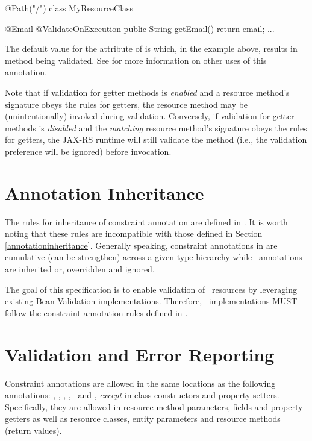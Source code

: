 \begin{listing}{1}
@Path("/")
class MyResourceClass {

  @Email
  @ValidateOnExecution
  public String getEmail() {
    return email;
  }
  ...
}
\end{listing}

The default value for the  attribute of  is  which, in the example above, results in method  being validated. See \cite{bv11} for more information on other uses of this annotation. 

Note that if validation for getter methods is {\em enabled} and a resource method's signature obeys the rules for getters, the resource method may be (unintentionally) invoked during validation. Conversely, if validation for getter methods is {\em disabled} and the {\em matching} resource method's signature obeys the rules for getters, the JAX-RS runtime will still validate the method (i.e., the validation preference will be ignored) before invocation.

\section{Annotation Inheritance}
\label{annotation_inheritance}

The rules for inheritance of constraint annotation are defined in \cite{bv11}. It is worth noting that these rules are incompatible with those defined in Section \ref{annotationinheritance}. Generally speaking, constraint annotations in \cite{bv11} are cumulative (can be strengthen) across a given type hierarchy while \jaxrs\ annotations are inherited or, overridden and ignored.

The goal of this specification is to enable validation of \jaxrs\ resources by leveraging existing Bean Validation implementations. Therefore, \jaxrs\ implementations MUST follow the constraint annotation rules defined in \cite{bv11}.

\section{Validation and Error Reporting}
\label{validation_and_error_reporting}

Constraint annotations are allowed in the same locations as the following annotations: \MatrixParam, \QueryParam, \PathParam, \CookieParam, \HeaderParam\ and \Context, {\em except} in class constructors and property setters. Specifically, they are allowed in resource method parameters, fields and property getters as well as resource classes, entity parameters and resource methods (return values). 

